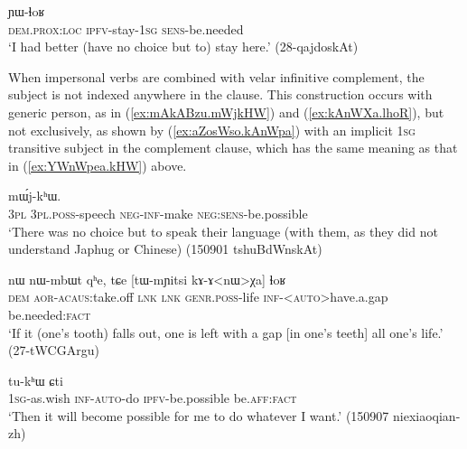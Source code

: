 \begin{exe} 
\ex \label{ex:kurAZia.YWlhoR}
 ɲɯ-ɬoʁ \\
\textsc{dem}.\textsc{prox}:\textsc{loc} \textsc{ipfv}-stay-\textsc{1sg} \textsc{sens}-be.needed \\
\glt `I had better (have no choice but to) stay here.' (28-qajdoskAt)
\end{exe} 


When impersonal verbs are combined with velar infinitive complement, the subject is not indexed anywhere in the clause. This construction occurs with generic person, as in (\ref{ex:mAkABzu.mWjkHW}) and (\ref{ex:kAnWXa.lhoR}), but not exclusively, as shown by (\ref{ex:aZosWso.kAnWpa}) with an implicit \textsc{1sg} transitive subject in the complement clause, which has the same meaning as that in (\ref{ex:YWnWpea.kHW}) above.

\begin{exe} 
\ex \label{ex:mAkABzu.mWjkHW}
 mɯ́j-kʰɯ. \\
\textsc{3pl} \textsc{3pl}.\textsc{poss}-speech \textsc{neg}-\textsc{inf}-make \textsc{neg}:\textsc{sens}-be.possible \\
\glt `There was no choice but to speak their language (with them, as they did not understand Japhug or Chinese) (150901 tshuBdWnskAt)
\end{exe} 

\begin{exe} 
\ex \label{ex:kAnWXa.lhoR}
\gll  nɯ nɯ-mbɯt qʰe, tɕe [tɯ-mɲitsi kɤ-ɤ<nɯ>χa] ɬoʁ \\
\textsc{dem} \textsc{aor}-\textsc{acaus}:take.off \textsc{lnk} \textsc{lnk} \textsc{genr}.\textsc{poss}-life \textsc{inf}-<\textsc{auto}>have.a.gap be.needed:\textsc{fact} \\
\glt `If it (one's tooth) falls out, one is left with a gap [in one's teeth] all one's life.' (27-tWCGArgu)
\end{exe} 

\begin{exe} 
\ex \label{ex:aZosWso.kAnWpa}
 tu-kʰɯ ɕti \\
\textsc{1sg}-as.wish \textsc{inf}-\textsc{auto}-do \textsc{ipfv}-be.possible be.\textsc{aff}:\textsc{fact} \\
\glt `Then it will become possible for me to do whatever I want.' (150907 niexiaoqian-zh)
\end{exe} 


